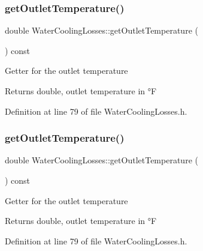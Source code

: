 \subsubsection{\texorpdfstring{get\+Outlet\+Temperature()}{getOutletTemperature()}\hspace{0.1cm}{\footnotesize\ttfamily [1/3]}}
{\footnotesize\ttfamily double Water\+Cooling\+Losses\+::get\+Outlet\+Temperature (\begin{DoxyParamCaption}{ }\end{DoxyParamCaption}) const\hspace{0.3cm}{\ttfamily [inline]}}

Getter for the outlet temperature \begin{DoxyReturn}{Returns}
double, outlet temperature in °F 
\end{DoxyReturn}


Definition at line 79 of file Water\+Cooling\+Losses.\+h.

\mbox{\label{class_water_cooling_losses_a79fb78755e813b2a3aa36ccd8ccebf7a}} 
\subsubsection{\texorpdfstring{get\+Outlet\+Temperature()}{getOutletTemperature()}\hspace{0.1cm}{\footnotesize\ttfamily [2/3]}}
{\footnotesize\ttfamily double Water\+Cooling\+Losses\+::get\+Outlet\+Temperature (\begin{DoxyParamCaption}{ }\end{DoxyParamCaption}) const\hspace{0.3cm}{\ttfamily [inline]}}

Getter for the outlet temperature \begin{DoxyReturn}{Returns}
double, outlet temperature in °F 
\end{DoxyReturn}


Definition at line 79 of file Water\+Cooling\+Losses.\+h.

\mbox{\label{class_water_cooling_losses_a79fb78755e813b2a3aa36ccd8ccebf7a}} 
